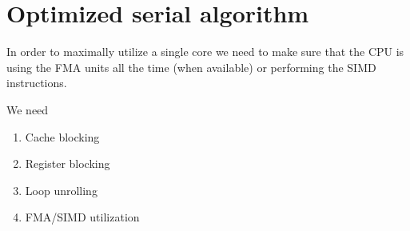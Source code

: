 
\section{Optimized serial algorithm}

  In order to maximally utilize a single core we need to make sure
  that the CPU is using the FMA units all the time (when available) or
  performing the SIMD instructions.

  We need

  \begin{enumerate}
  \item Cache blocking
  \item Register blocking
  \item Loop unrolling
  \item FMA/SIMD utilization
  \end{enumerate}





%  
